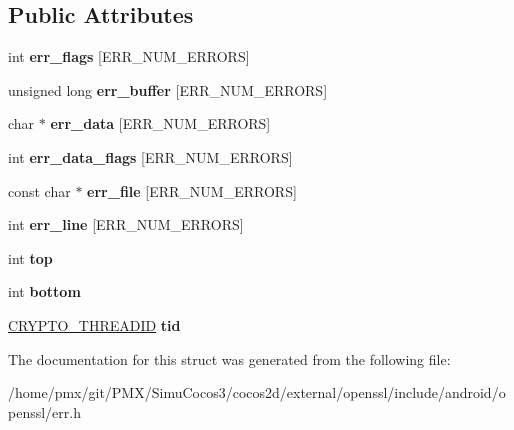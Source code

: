 \subsection*{Public Attributes}
\begin{DoxyCompactItemize}
\item 
\mbox{\label{structerr__state__st_aec965566a096665aa9f089244c45cf51}} 
int {\bfseries err\+\_\+flags} \mbox{[}E\+R\+R\+\_\+\+N\+U\+M\+\_\+\+E\+R\+R\+O\+RS\mbox{]}
\item 
\mbox{\label{structerr__state__st_af7a186e56bd8bb5740eabca2f38b5d91}} 
unsigned long {\bfseries err\+\_\+buffer} \mbox{[}E\+R\+R\+\_\+\+N\+U\+M\+\_\+\+E\+R\+R\+O\+RS\mbox{]}
\item 
\mbox{\label{structerr__state__st_a9577a2905150280d4676c6a13fc1830c}} 
char $\ast$ {\bfseries err\+\_\+data} \mbox{[}E\+R\+R\+\_\+\+N\+U\+M\+\_\+\+E\+R\+R\+O\+RS\mbox{]}
\item 
\mbox{\label{structerr__state__st_ae80b85ca41f90bcb261d1fdcdba3f66b}} 
int {\bfseries err\+\_\+data\+\_\+flags} \mbox{[}E\+R\+R\+\_\+\+N\+U\+M\+\_\+\+E\+R\+R\+O\+RS\mbox{]}
\item 
\mbox{\label{structerr__state__st_a61f8bea17f0cebdf64dbb611b2d186c1}} 
const char $\ast$ {\bfseries err\+\_\+file} \mbox{[}E\+R\+R\+\_\+\+N\+U\+M\+\_\+\+E\+R\+R\+O\+RS\mbox{]}
\item 
\mbox{\label{structerr__state__st_ac5cc908ee43b95e32e4e0b092afa637e}} 
int {\bfseries err\+\_\+line} \mbox{[}E\+R\+R\+\_\+\+N\+U\+M\+\_\+\+E\+R\+R\+O\+RS\mbox{]}
\item 
\mbox{\label{structerr__state__st_a02b49831a2d90a87b14ae7ad28f0bfb7}} 
int {\bfseries top}
\item 
\mbox{\label{structerr__state__st_a91a24fe0ee64f2618dac094713874c01}} 
int {\bfseries bottom}
\item 
\mbox{\label{structerr__state__st_a9bc9ea657d62cb9d4875cdecb09993b4}} 
\hyperlink{structcrypto__threadid__st}{C\+R\+Y\+P\+T\+O\+\_\+\+T\+H\+R\+E\+A\+D\+ID} {\bfseries tid}
\end{DoxyCompactItemize}


The documentation for this struct was generated from the following file\+:\begin{DoxyCompactItemize}
\item 
/home/pmx/git/\+P\+M\+X/\+Simu\+Cocos3/cocos2d/external/openssl/include/android/openssl/err.\+h\end{DoxyCompactItemize}

